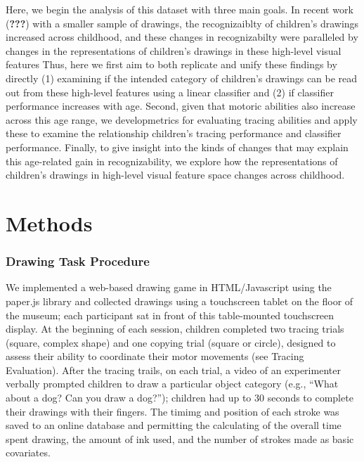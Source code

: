 \documentclass[10pt, letterpaper]{article}
\begin{document}
Here, we begin the analysis of this dataset with three main goals. In
recent work ({\textbf{???}}) with a smaller sample of drawings, the
recognizaiblty of children's drawings increased across childhood, and
these changes in recognizabilty were paralleled by changes in the
representations of children's drawings in these high-level visual
features Thus, here we first aim to both replicate and unify these
findings by directly (1) examining if the intended category of
children's drawings can be read out from these high-level features using
a linear classifier and (2) if classifier performance increases with
age. Second, given that motoric abilities also increase across this age
range, we developmetrics for evaluating tracing abilities and apply
these to examine the relationship children's tracing performance and
classifier performance. Finally, to give insight into the kinds of
changes that may explain this age-related gain in recognizability, we
explore how the representations of children's drawings in high-level
visual feature space changes across childhood.

\section{Methods}\label{methods}

\subsubsection{Drawing Task Procedure}\label{drawing-task-procedure}

We implemented a web-based drawing game in HTML/Javascript using the
paper.js library and collected drawings using a touchscreen tablet on
the floor of the museum; each participant sat in front of this
table-mounted touchscreen display. At the beginning of each session,
children completed two tracing trials (square, complex shape) and one
copying trial (square or circle), designed to assess their ability to
coordinate their motor movements (see Tracing Evaluation). After the
tracing trails, on each trial, a video of an experimenter verbally
prompted children to draw a particular object category (e.g., ``What
about a dog? Can you draw a dog?''); children had up to 30 seconds to
complete their drawings with their fingers. The timimg and position of
each stroke was saved to an online database and permitting the
calculating of the overall time spent drawing, the amount of ink used,
and the number of strokes made as basic covariates.
\end{document}
